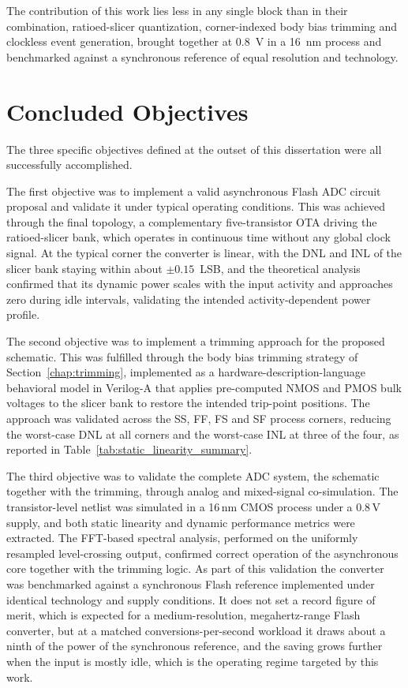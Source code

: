 The contribution of this work lies less in any single block than in their combination,
ratioed-slicer quantization, corner-indexed body bias trimming and clockless event generation,
brought together at $0.8$~V in a 16~nm process and benchmarked against a synchronous reference
of equal resolution and technology.

\section{Concluded Objectives}

The three specific objectives defined at the outset of this dissertation were all successfully
accomplished.

The first objective was to implement a valid asynchronous Flash ADC circuit proposal and
validate it under typical operating conditions. This was achieved through the final topology, a
complementary five-transistor OTA driving the ratioed-slicer bank, which operates in continuous
time without any global clock signal. At the typical corner the converter is linear, with the DNL
and INL of the slicer bank staying within about $\pm 0.15$~LSB, and the theoretical analysis
confirmed that its dynamic power scales with the input activity and approaches zero during idle
intervals, validating the intended activity-dependent power profile.

The second objective was to implement a trimming approach for the proposed schematic. This
was fulfilled through the body bias trimming strategy of Section~\ref{chap:trimming}, implemented
as a hardware-description-language behavioral model in Verilog-A that applies pre-computed NMOS
and PMOS bulk voltages to the slicer bank to restore the intended trip-point positions. The
approach was validated across the SS, FF, FS and SF process corners, reducing the worst-case DNL
at all corners and the worst-case INL at three of the four, as reported in
Table~\ref{tab:static_linearity_summary}.

The third objective was to validate the complete ADC system, the schematic together with the
trimming, through analog and mixed-signal co-simulation. The transistor-level netlist was
simulated in a 16\,nm CMOS process under a 0.8\,V supply, and both static linearity and dynamic
performance metrics were extracted. The FFT-based spectral analysis, performed on the uniformly
resampled level-crossing output, confirmed correct operation of the asynchronous core together
with the trimming logic. As part of this validation the converter was benchmarked against a
synchronous Flash reference implemented under identical technology and supply conditions. It does
not set a record figure of merit, which is expected for a medium-resolution, megahertz-range Flash
converter, but at a matched conversions-per-second workload it draws about a ninth of the power of
the synchronous reference, and the saving grows further when the input is mostly idle, which is the
operating regime targeted by this work.

